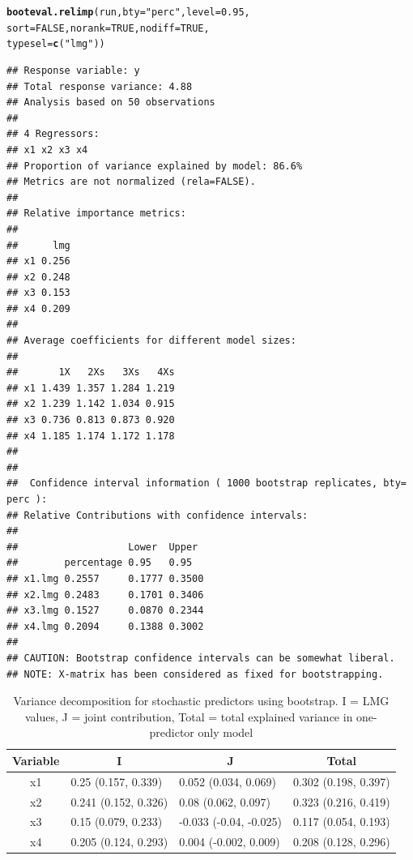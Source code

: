 \documentclass[11pt,a4paper,twoside]{book}\usepackage[]{graphicx}\usepackage[]{color}
\makeatletter
\newcommand{\hlnum}[1]{\textcolor[rgb]{0.686,0.059,0.569}{#1}}%
\newcommand{\hlstr}[1]{\textcolor[rgb]{0.192,0.494,0.8}{#1}}%
\newcommand{\hlstd}[1]{\textcolor[rgb]{0.345,0.345,0.345}{#1}}%
\newcommand{\hlkwc}[1]{\textcolor[rgb]{0.333,0.667,0.333}{#1}}%
\newcommand{\hlkwd}[1]{\textcolor[rgb]{0.737,0.353,0.396}{\textbf{#1}}}%
\newenvironment{kframe}{%
 \def\at@end@of@kframe{}%
 \ifinner\ifhmode%
  \def\at@end@of@kframe{\end{minipage}}%
  \begin{minipage}{\columnwidth}%
 \fi\fi%
 \def\FrameCommand##1{\hskip\@totalleftmargin \hskip-\fboxsep
 \colorbox{shadecolor}{##1}\hskip-\fboxsep
     \hskip-\linewidth \hskip-\@totalleftmargin \hskip\columnwidth}%
 \MakeFramed {\advance\hsize-\width
   \@totalleftmargin\z@ \linewidth\hsize
   \@setminipage}}%
 {\par\unskip\endMakeFramed%
 \at@end@of@kframe}
\newenvironment{knitrout}{}{} %
\makeatother
\begin{document}
\begin{knitrout}
\begin{kframe}
\begin{alltt}
\hlkwd{booteval.relimp}\hlstd{(run,} \hlkwc{bty} \hlstd{=} \hlstr{"perc"}\hlstd{,} \hlkwc{level} \hlstd{=} \hlnum{0.95}\hlstd{,}
                \hlkwc{sort} \hlstd{=} \hlnum{FALSE}\hlstd{,} \hlkwc{norank} \hlstd{=} \hlnum{TRUE}\hlstd{,} \hlkwc{nodiff} \hlstd{=} \hlnum{TRUE}\hlstd{,}
                \hlkwc{typesel} \hlstd{=} \hlkwd{c}\hlstd{(}\hlstr{"lmg"}\hlstd{))}
\end{alltt}
\begin{verbatim}
## Response variable: y 
## Total response variance: 4.88 
## Analysis based on 50 observations 
## 
## 4 Regressors: 
## x1 x2 x3 x4 
## Proportion of variance explained by model: 86.6%
## Metrics are not normalized (rela=FALSE). 
## 
## Relative importance metrics: 
## 
##      lmg
## x1 0.256
## x2 0.248
## x3 0.153
## x4 0.209
## 
## Average coefficients for different model sizes: 
## 
##       1X   2Xs   3Xs   4Xs
## x1 1.439 1.357 1.284 1.219
## x2 1.239 1.142 1.034 0.915
## x3 0.736 0.813 0.873 0.920
## x4 1.185 1.174 1.172 1.178
## 
##  
##  Confidence interval information ( 1000 bootstrap replicates, bty= perc ): 
## Relative Contributions with confidence intervals: 
##  
##                   Lower  Upper
##        percentage 0.95   0.95  
## x1.lmg 0.2557     0.1777 0.3500
## x2.lmg 0.2483     0.1701 0.3406
## x3.lmg 0.1527     0.0870 0.2344
## x4.lmg 0.2094     0.1388 0.3002
## 
## CAUTION: Bootstrap confidence intervals can be somewhat liberal. 
## NOTE: X-matrix has been considered as fixed for bootstrapping.
\end{verbatim}
\end{kframe}
\end{knitrout}

\begin{table}[h]
\centering
\begin{tabular}{clll}
  \hline
  \multicolumn{1}{c}{\textbf{Variable}} & \multicolumn{1}{c}{\textbf{I}} &\multicolumn{1}{c}{\textbf{J}} & \multicolumn{1}{c}{\textbf{Total}} \\
  \hline
x1 & 0.25 (0.157, 0.339)  & 0.052 (0.034, 0.069)   & 0.302 (0.198, 0.397)  \\ 
x2 & 0.241 (0.152, 0.326)  & 0.08 (0.062, 0.097)   & 0.323 (0.216, 0.419)  \\ 
x3 & 0.15 (0.079, 0.233)  & -0.033 (-0.04, -0.025)   & 0.117 (0.054, 0.193)  \\ 
x4 & 0.205 (0.124, 0.293)  & 0.004 (-0.002, 0.009)   & 0.208 (0.128, 0.296)  \\ 

   \hline
\end{tabular}
\caption{Variance decomposition for stochastic predictors using bootstrap. I = LMG values, J = joint contribution, Total = total explained variance in one-predictor only model}
\label{tbl:nonstochEx1}
\end{table}
\end{document}
